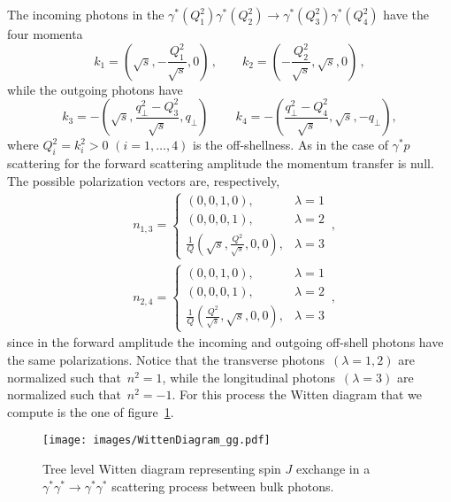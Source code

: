 \documentclass[a4paper,12pt]{article}
\begin{document}
The incoming photons in the $\gamma^{*}\left(Q_1^2\right) \gamma^{*}\left(Q_2^2\right) \rightarrow \gamma^{*}\left(Q_3^2\right) \gamma^{*}\left(Q_4^2\right)$  have the four momenta
\begin{equation} 
k_1 = \left( \sqrt{s}, - \frac{Q_1^2}{\sqrt{s}}, 0 \right) \,,  \qquad  
k_2 = \left( - \frac{Q_2^2}{\sqrt{s}}, \sqrt{s},  0 \right) \,,
\end{equation}
while the outgoing photons have
\begin{equation}
k_3 = - \left( \sqrt{s},  \frac{q_\perp^2 - Q_3^2}{\sqrt{s}}, q_\perp \right) \, \qquad  k_4 = - \left(  \frac{q_\perp^2-Q_4^2}{\sqrt{s}}, \sqrt{s},  -q_\perp \right),
\end{equation}
where $Q^2_i = k_i^2 >0$  $(i=1, \dots, 4)$ is the off-shellness. As in the case of $\gamma^* p$ scattering for the forward scattering amplitude the 
momentum transfer is null.
The possible polarization vectors are, respectively,
\begin{align}
    &n_{1,3} =
    \begin{cases}
      \left(0,0,1,0\right), & \lambda=1 \\
      \left(0,0,0,1\right), & \lambda=2 \\
      \frac{1}{Q} \left( \sqrt{s}, \frac{Q^2}{\sqrt{s}}, 0, 0 \right), & \lambda = 3
    \end{cases}\,,\\
    &n_{2,4} =
    \begin{cases}
      \left(0,0,1,0\right), & \lambda=1 \\
      \left(0,0,0,1\right), & \lambda=2 \\
      \frac{1}{Q} \left( \frac{Q^2}{\sqrt{s}}, \sqrt{s}, 0, 0 \right), & \lambda = 3
    \end{cases} \,,
    \label{eq:inPolarization}
\end{align}
since in the forward amplitude the incoming and outgoing off-shell photons have the same polarizations.
Notice that the transverse photons~$\left(\lambda=1,2\right)$ are normalized such that~$n^2 = 1$, while the longitudinal photons~$\left(\lambda=3\right)$ are normalized such that~$n^2 = -1$.
For this process the Witten diagram that we compute is the one of figure~\ref{fig:Witten_diagram_gamma_gamma}.
\begin{figure}[!h]
  \center
  \texttt{[image: images/WittenDiagram\_gg.pdf]} 
  \caption{Tree level Witten diagram representing spin $J$    exchange in a $\gamma^* \gamma^* \to \gamma^* \gamma^*$ scattering process between bulk photons.}
  \label{fig:Witten_diagram_gamma_gamma}
\end{figure}
\end{document}
